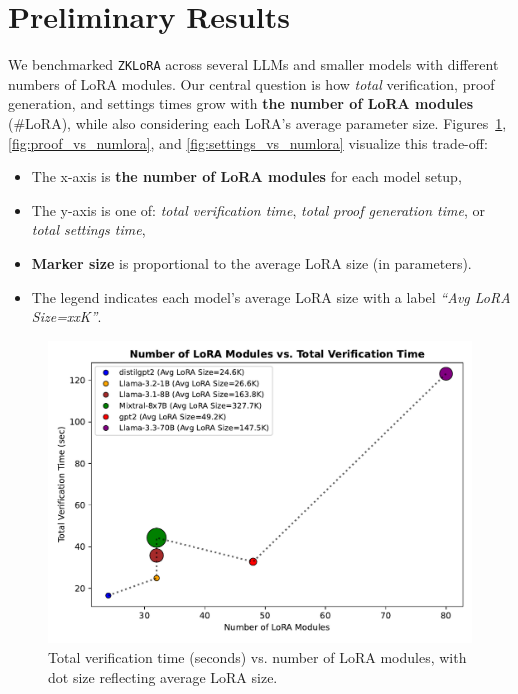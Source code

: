 \documentclass[11pt]{article}
\begin{document}
\section{Preliminary Results}

We benchmarked \texttt{ZKLoRA} across several LLMs and smaller models with different numbers of LoRA modules. 
Our central question is how \emph{total} verification, proof generation, and settings times grow with \textbf{the number of LoRA modules} (\#LoRA), while also considering each LoRA's average parameter size. 
Figures~\ref{fig:verify_vs_numlora}, \ref{fig:proof_vs_numlora}, and \ref{fig:settings_vs_numlora} visualize this trade-off:
\begin{itemize}
    \item The x-axis is \textbf{the number of LoRA modules} for each model setup,
    \item The y-axis is one of: \textit{total verification time}, \textit{total proof generation time}, or \textit{total settings time},
    \item \textbf{Marker size} is proportional to the average LoRA size (in parameters).
    \item The legend indicates each model’s average LoRA size with a label \textit{“Avg LoRA Size=xxK”}.
\end{itemize}

\begin{figure}[ht]
    \centering
    \includegraphics[width=0.65\linewidth]{figs/fig_verify_vs_numlora.pdf}
    \caption{Total verification time (seconds) vs. number of LoRA modules, with dot size reflecting average LoRA size.}
    \label{fig:verify_vs_numlora}
\end{figure}
\end{document}
